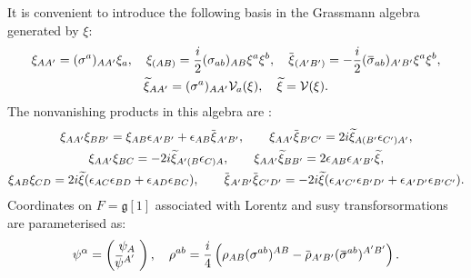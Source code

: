 \documentclass[a4paper,12pt]{article}
\numberwithin{equation}{section} %
\renewcommand{\tilde}{\widetilde}
\newcommand{\Liealg}{\mathfrak}
\newcommand{\algg}{\Liealg{g}}
\numberwithin{equation}{section}
\newcommand{\overbar}[1]{\mkern 1.5mu\overline{\mkern-1.5mu#1\mkern-1.5mu}\mkern 1.5mu}
\newcommand{\psibar}{\overbar{\psi}}
\newcommand{\sigmabar}{\overbar{\sigma}}
\newcommand{\rhobar}{\overbar{\rho}}
\newcommand{\xitilde}{\tilde{\xi}}
\newcommand{\xibar}{\overbar{\xi}}
\newcommand{\alphadot}{{A^\prime}}
\newcommand{\betadot}{{B^\prime}}
\newcommand{\gammadot}{{C^\prime}}
\newcommand{\deltadot}{{D^\prime}}
\newcommand{\B}{{B}}
\newcommand{\C}{{C}}
\begin{document}
\begin{appendix}
It is convenient to introduce the following basis in the Grassmann algebra generated by  $\xi$:
\begin{equation}
\begin{gathered}
    \xi_{A\alphadot} = (\sigma^a)_{A\alphadot}\xi_a, \quad \xi_{(A\B)} = \frac{i}{2}(\sigma_{ab})_{A\B}\xi^a\xi^b, \quad \xibar_{(\alphadot\betadot)} = -\frac{i}{2}(\sigmabar_{ab})_{\alphadot\betadot}\xi^a\xi^b,\\
    \xitilde_{A\alphadot} = (\sigma^{a})_{A\alphadot} \mathcal{V}_a(\xi), \quad \xitilde = \mathcal{V}(\xi).
\end{gathered}
\end{equation}
The nonvanishing products in this algebra are :
\begin{equation}
\begin{gathered}
    \xi_{A\alphadot}\xi_{\B \betadot} =  \xi_{A\B} \epsilon_{\alphadot\betadot}+\epsilon_{A\B}\xibar_{\alphadot\betadot}, \qquad  \xi_{A\alphadot}\xibar_{\betadot\gammadot} =  2i\xitilde_{A (\betadot}\epsilon_{\gammadot)\alphadot},\\
     \xi_{A\alphadot} \xi_{\B\C} = -2i\xitilde_{\alphadot(\B}\epsilon_{\C)A}, \qquad \xi_{A\alphadot}\xitilde_{\B\betadot}=2\epsilon_{A\B}\epsilon_{\alphadot\betadot}\xitilde,\\
    \xi_{A\B}\xi_{\C D} = 2i\xitilde(\epsilon_{A\C}\epsilon_{\B D}+\epsilon_{A D}\epsilon_{\B\C}), \qquad \xibar_{\alphadot\betadot}\xibar_{\gammadot\deltadot} = -2i\xitilde(\epsilon_{\alphadot\gammadot}\epsilon_{\betadot\deltadot}+\epsilon_{\alphadot\deltadot}\epsilon_{\betadot\gammadot}).\\
\end{gathered}
\end{equation}
Coordinates on $F=\algg[1]$ associated with Lorentz and susy transforsormations are parameterised as:
\begin{equation}
    \psi^\alpha=\begin{pmatrix}
    \psi_A\\
    \psibar^\alphadot\
\end{pmatrix},\quad \rho^{ab} = \frac{i}{4}\left(\rho_{A\B}(\sigma^{ab})^{A\B}-\rhobar_{\alphadot\betadot}(\sigmabar^{ab})^{\alphadot\betadot}\right).
\end{equation}


\end{appendix}
\end{document}
